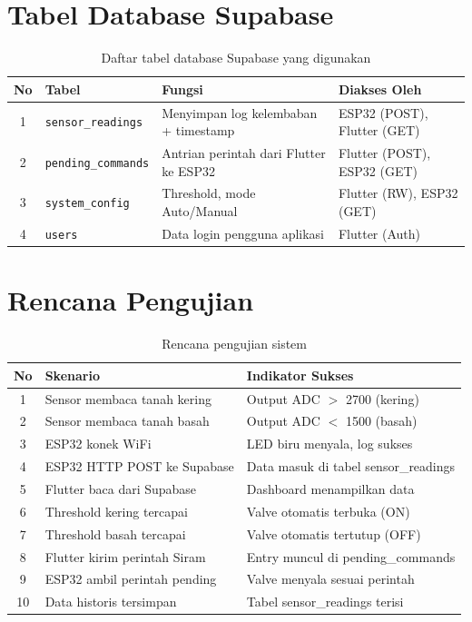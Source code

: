 \documentclass[12pt,a4paper,oneside]{report}
\begin{document}
\section{Tabel Database Supabase}

\begin{table}[H]
\centering
\caption{Daftar tabel database Supabase yang digunakan}
\label{tab:supabase-tables}
\begin{tabularx}{\textwidth}{c X X X}
\toprule
\textbf{No} & \textbf{Tabel} & \textbf{Fungsi} & \textbf{Diakses Oleh} \\
\midrule
1 & \texttt{sensor\_readings} & Menyimpan log kelembaban + timestamp & ESP32 (POST), Flutter (GET) \\
2 & \texttt{pending\_commands} & Antrian perintah dari Flutter ke ESP32 & Flutter (POST), ESP32 (GET) \\
3 & \texttt{system\_config} & Threshold, mode Auto/Manual & Flutter (RW), ESP32 (GET) \\
4 & \texttt{users} & Data login pengguna aplikasi & Flutter (Auth) \\
\bottomrule
\end{tabularx}
\end{table}

\section{Rencana Pengujian}

\begin{table}[H]
\centering
\caption{Rencana pengujian sistem}
\label{tab:testing}
\begin{tabularx}{\textwidth}{c X X}
\toprule
\textbf{No} & \textbf{Skenario} & \textbf{Indikator Sukses} \\
\midrule
1 & Sensor membaca tanah kering & Output ADC $>$ 2700 (kering) \\
2 & Sensor membaca tanah basah & Output ADC $<$ 1500 (basah) \\
3 & ESP32 konek WiFi & LED biru menyala, log sukses \\
4 & ESP32 HTTP POST ke Supabase & Data masuk di tabel sensor\_readings \\
5 & Flutter baca dari Supabase & Dashboard menampilkan data \\
6 & Threshold kering tercapai & Valve otomatis terbuka (ON) \\
7 & Threshold basah tercapai & Valve otomatis tertutup (OFF) \\
8 & Flutter kirim perintah Siram & Entry muncul di pending\_commands \\
9 & ESP32 ambil perintah pending & Valve menyala sesuai perintah \\
10 & Data historis tersimpan & Tabel sensor\_readings terisi \\
\bottomrule
\end{tabularx}
\end{table}
\end{document}
